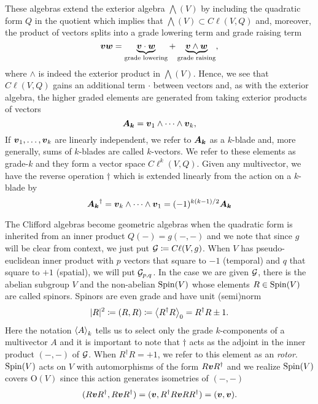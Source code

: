 \documentclass[conf]{new-aiaa}
\begin{document}
These algebras extend the exterior algebra $\bigwedge(V)$ by including the quadratic form $Q$ in the quotient which implies that $\bigwedge(V)\subset C\ell(V,Q)$ and, moreover, the product of vectors splits into a grade lowering term and grade raising term
\begin{equation}
    \blade{v}\blade{w}= \underbrace{\blade{v}\cdot \blade{w}}_{\textrm{grade lowering}} +\underbrace{\blade{v}\wedge \blade{w}}_{\textrm{grade raising}},
\end{equation}
where $\wedge$ is indeed the exterior product in $\bigwedge(V)$. Hence, we see that $C\ell(V,Q)$ gains an additional term $\cdot$ between vectors and, as with the exterior algebra, the higher graded elements are generated from taking exterior products of vectors
\begin{equation}
    \blade{A_k} = \blade{v}_1 \wedge \cdots \wedge \blade{v}_k,
\end{equation}
If $\blade{v}_1,\dots,\blade{v}_k$ are linearly independent, we refer to $\blade{A_k}$ as a $k$-blade and, more generally, sums of $k$-blades are called $k$-vectors. We refer to these elements as grade-$k$ and they form a vector space $C\ell^k(V,Q)$. Given any multivector, we have the reverse operation $\dagger$ which is extended linearly from the action on a $k$-blade by
\begin{equation}
    \blade{A_k}^\dagger = \blade{v}_k\wedge \cdots \wedge \blade{v}_1 = (-1)^{k(k-1)/2} \blade{A_k}
\end{equation}

The Clifford algebras become geometric algebras when the quadratic form is inherited from an inner product $Q(-)=g(-,-)$ and we note that since $g$ will be clear from context, we just put $\G\coloneqq C\ell(V,g)$. When $V$ has pseudo-euclidean inner product with $p$ vectors that square to $-1$ (temporal) and $q$ that square to $+1$ (spatial), we will put $\G_{p,q}$. In the case we are given $\G$, there is the abelian subgroup $V$ and the non-abelian $\sping(V)$ whose elements $R\in \sping(V)$ are called spinors. Spinors are even grade and have unit (semi)norm
\begin{equation}
|R|^2 \coloneqq (R,R) \coloneqq \proj{0}{R^\dagger R}= R^\dagger R\pm 1.
\end{equation}
Here the notation $\proj{k}{A}$ tells us to select only the grade $k$-components of a multivector $A$ and it is important to note that $\dagger$ acts as the adjoint in the inner product $(-,-)$ of $\G$. When $R^\dagger R = +1$, we refer to this element as an \emph{rotor}. $\sping(V)$ acts on $V$ with automorphisms of the form $R \blade{v} R^\dagger$ and we realize $\sping(V)$ covers $\mathrm{O}(V)$ since this action generates isometries of $(-,-)$ 
\begin{equation}
    (R\blade{v}R^\dagger,R\blade{v}R^\dagger) = (\blade{v},R^\dagger R \blade{v} RR^\dagger) = (\blade{v},\blade{v}).
\end{equation}
\end{document}
